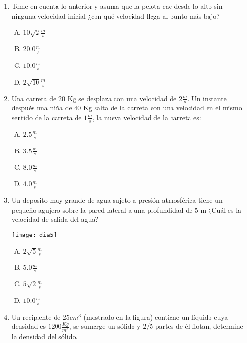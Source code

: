 \begin{enumerate}

\item Tome en cuenta lo anterior y asuma que la pelota cae desde lo alto sin ninguna velocidad inicial ¿con qué velocidad llega al punto más bajo? \label{dia-16}

\begin{enumerate}[(A)]
\item $10\sqrt{2}\frac{m}{s}$
\item $20.0\frac{m}{s}$
\item $10.0\frac{m}{s}$
\item $2\sqrt{10}\frac{m}{s}$
\end{enumerate}

\item Una carreta de $20$ Kg se desplaza con una velocidad de $2\frac{m}{s}$. Un instante después una niña de $40$ Kg salta de la carreta con una velocidad en el mismo sentido de la carreta de $1\frac{m}{s}$, la nueva velocidad de la carreta es: \label{dia-17}

\begin{enumerate}[(A)]
\item $2.5\frac{m}{s}$
\item $3.5\frac{m}{s}$
\item $8.0\frac{m}{s}$
\item $4.0\frac{m}{s}$
\end{enumerate}

\newpage
\item Un deposito muy grande de agua sujeto a presión atmosférica tiene un pequeño agujero sobre la pared lateral a una profundidad de $5$ m ¿Cuál es la velocidad de salida del agua? \label{dia-18}

\texttt{[image: dia5]}

\begin{enumerate}[(A)]
\item $2\sqrt{5}\frac{m}{s}$
\item $5.0\frac{m}{s}$
\item $5\sqrt{2}\frac{m}{s}$
\item $10.0\frac{m}{s}$
\end{enumerate}

\item Un recipiente de $25cm^3$ (mostrado en la figura) contiene un líquido cuya densidad es $1200\frac{Kg}{m^3}$, se sumerge un sólido y $2/5$ partes de él flotan, determine la densidad del sólido. \label{dia-19}


\end{enumerate}
